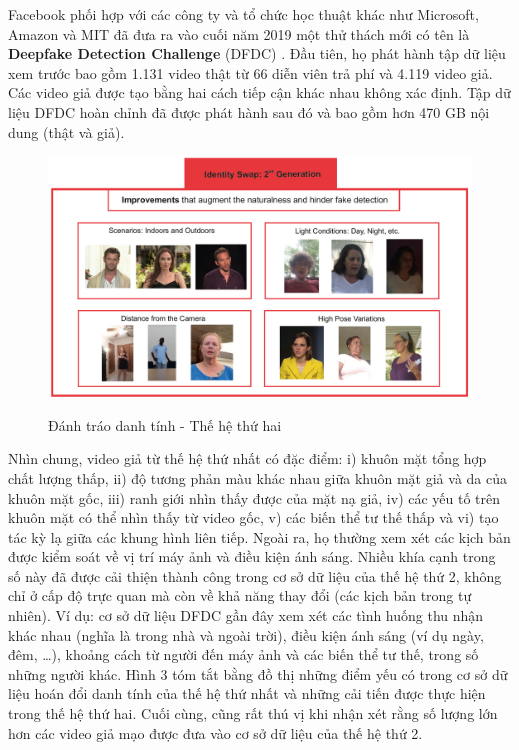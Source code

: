\documentclass{article}
\begin{document}
Facebook phối hợp với các công ty và tổ chức học thuật khác như Microsoft, Amazon và MIT đã đưa ra vào cuối năm 2019 một thử thách mới có tên là \textbf{Deepfake Detection Challenge} (DFDC) . Đầu tiên, họ phát hành tập dữ liệu xem trước bao gồm 1.131 video thật từ 66 diễn viên trả phí và 4.119 video giả. Các video giả được tạo bằng hai cách tiếp cận khác nhau không xác định. Tập dữ liệu DFDC hoàn chỉnh đã được phát hành sau đó và bao gồm hơn 470 GB nội dung (thật và giả).

\begin{figure}[h!]
\caption{Đánh tráo danh tính - Thế hệ thứ hai}
\includegraphics[width=\textwidth]{fig-4-id-swap-gen2}
\label{fig-4-id-swap-gen2}
\end{figure}

Nhìn chung, video giả từ thế hệ thứ nhất có đặc điểm: i) khuôn mặt tổng hợp chất lượng thấp, ii) độ tương phản màu khác nhau giữa khuôn mặt giả và da của khuôn mặt gốc, iii) ranh giới nhìn thấy được của mặt nạ giả, iv) các yếu tố trên khuôn mặt có thể nhìn thấy từ video gốc, v) các biến thể tư thế thấp và vi) tạo tác kỳ lạ giữa các khung hình liên tiếp. Ngoài ra, họ thường xem xét các kịch bản được kiểm soát về vị trí máy ảnh và điều kiện ánh sáng. Nhiều khía cạnh trong số này đã được cải thiện thành công trong cơ sở dữ liệu của thế hệ thứ 2, không chỉ ở cấp độ trực quan mà còn về khả năng thay đổi (các kịch bản trong tự nhiên). Ví dụ: cơ sở dữ liệu DFDC gần đây xem xét các tình huống thu nhận khác nhau (nghĩa là trong nhà và ngoài trời), điều kiện ánh sáng (ví dụ ngày, đêm, …), khoảng cách từ người đến máy ảnh và các biến thể tư thế, trong số những người khác. Hình 3 tóm tắt bằng đồ thị những điểm yếu có trong cơ sở dữ liệu hoán đổi danh tính của thế hệ thứ nhất và những cải tiến được thực hiện trong thế hệ thứ hai. Cuối cùng, cũng rất thú vị khi nhận xét rằng số lượng lớn hơn các video giả mạo được đưa vào cơ sở dữ liệu của thế hệ thứ 2.
\end{document}
